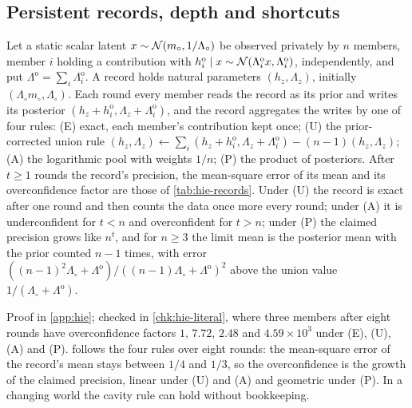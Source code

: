 \subsection{Persistent records, depth and shortcuts}\label{sup:hie-persistent-records-depth-and-shortcuts}

\begin{proposition}\label{prop:hie-literal-records}
Let a static scalar latent $x\sim\mathcal{N}(m_\circ,1/\Lambda_\circ)$ be observed privately by $n$ members, member $i$ holding a contribution with $h^{\mathrm o}_i\mid x\sim\mathcal{N}(\Lambda^{\mathrm o}_ix,\Lambda^{\mathrm o}_i)$, independently, and put $\Lambda^{\mathrm o}=\sum_i\Lambda^{\mathrm o}_i$. A record holds natural parameters $(h_z,\Lambda_z)$, initially $(\Lambda_\circ m_\circ,\Lambda_\circ)$. Each round every member reads the record as its prior and writes its posterior $(h_z+h^{\mathrm o}_i,\Lambda_z+\Lambda^{\mathrm o}_i)$, and the record aggregates the writes by one of four rules: (E) exact, each member's contribution kept once; (U) the prior-corrected union rule $(h_z,\Lambda_z)\leftarrow\sum_i(h_z+h^{\mathrm o}_i,\Lambda_z+\Lambda^{\mathrm o}_i)-(n-1)(h_z,\Lambda_z)$; (A) the logarithmic pool with weights $1/n$; (P) the product of posteriors. After $t\ge1$ rounds the record's precision, the mean-square error of its mean and its overconfidence factor are those of \cref{tab:hie-records}. Under (U) the record is exact after one round and then counts the data once more every round; under (A) it is underconfident for $t<n$ and overconfident for $t>n$; under (P) the claimed precision grows like $n^t$, and for $n\ge3$ the limit mean is the posterior mean with the prior counted $n-1$ times, with error $((n-1)^2\Lambda_\circ+\Lambda^{\mathrm o})/((n-1)\Lambda_\circ+\Lambda^{\mathrm o})^2$ above the union value $1/(\Lambda_\circ+\Lambda^{\mathrm o})$.
\end{proposition}

Proof in \cref{app:hie}; checked in \cref{chk:hie-literal}, where three members after eight rounds have overconfidence factors $1$, $7.72$, $2.48$ and $4.59\times10^3$ under (E), (U), (A) and (P).  follows the four rules over eight rounds: the mean-square error of the record's mean stays between $1/4$ and $1/3$, so the overconfidence is the growth of the claimed precision, linear under (U) and (A) and geometric under (P). In a changing world the cavity rule can hold without bookkeeping.

